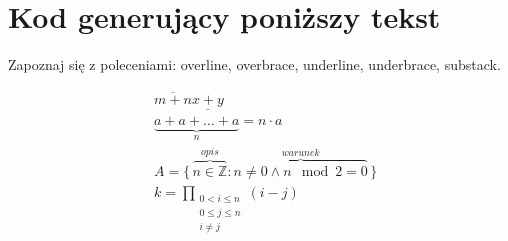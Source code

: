 \documentclass[a4paper,12pt]{article}
\begin{document}
	
	
	\section{Kod generujący poniższy tekst}
	Zapoznaj się z poleceniami: overline, overbrace, underline, underbrace,
	substack.
	
	\begin{align*}
		& \overline{m + n} \underline{x + y}\\
		& \underbrace{a + a + \ldots + a}_{n} = n \cdot a\\
		& A = \{\,\overbrace{n \in \mathbb{Z}}^{opis}\colon
		\overbrace{n \ne 0 \land n \mod 2 = 0}^{warunek}\,\}\\
		& k = \prod_{\substack{0 < i \leqslant n \\
				0 \leqslant j \leqslant n \\ i \ne j}}(i - j)
	\end{align*}
\end{document}
